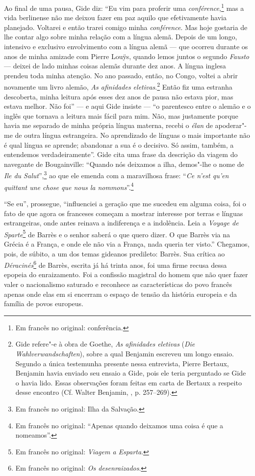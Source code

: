 Ao final de uma pausa, Gide diz: ``Eu vim para proferir uma
\emph{conférence},\footnote{Em francês no original: conferência. \versal{[N.~T.]}} mas a vida
berlinense não me deixou fazer em paz aquilo que efetivamente havia
planejado. Voltarei e então trarei comigo minha \emph{conférence}. Mas
hoje gostaria de lhe contar algo sobre minha relação com a língua alemã.
Depois de um longo, intensivo e exclusivo envolvimento com a língua
alemã --- que ocorreu durante os anos de minha amizade com Pierre Louÿs,
quando lemos juntos o segundo \emph{Fausto} --- deixei de lado minhas
coisas alemãs durante dez anos. A língua inglesa prendeu toda minha
atenção. No ano passado, então, no Congo, voltei a abrir novamente um
livro alemão, \emph{As afinidades eletivas}.\footnote{Gide
  refere"-e à obra de Goethe, \emph{As afinidades eletivas} (\emph{Die
  Wahlverwandschaften}), sobre a qual Benjamin escreveu um longo ensaio.
  Segundo a única testemunha presente nessa entrevista, Pierre Bertaux,
  Benjamin havia enviado seu ensaio a Gide, pois ele teria perguntado se
  Gide o havia lido. Essas observações foram feitas em carta de Bertaux
  a respeito desse encontro (Cf. Walter Benjamin, ,
  p. 257--269). \versal{[N.~T.]}} Então fiz uma estranha descoberta, minha leitura após esses
dez anos de pausa não estava pior, mas estava melhor. Não foi'' --- e aqui
Gide insiste --- ``o parentesco entre o alemão e o inglês que tornava a
leitura mais fácil para mim. Não, mas justamente porque havia me
separado de minha própria língua materna, recebi o \emph{élan} de
apoderar"-me de outra língua estrangeira. No aprendizado de línguas o
mais importante não é qual língua se aprende; abandonar a sua é o
decisivo. Só assim, também, a entendemos verdadeiramente''. Gide cita
uma frase da descrição da viagem do navegante de Bougainville: ``Quando
nós deixamos a ilha, demos"-lhe o nome de \emph{Ile du Salut}'',\footnote{Em francês no original: Ilha da Salvação. \versal{[N.~T.]}} ao que ele emenda com a maravilhosa
frase: ``\emph{Ce n'est qu'en quittant une chose que nous la
nommons}''.\footnote{Em francês no original: ``Apenas quando deixamos uma coisa é que a
  nomeamos''. \versal{[N.~T.]}}

``Se eu'', prossegue, ``influenciei a geração que me sucedeu em alguma
coisa, foi o fato de que agora os franceses começam a mostrar interesse
por terras e línguas estrangeiras, onde antes reinava a indiferença e a
indolência. Leia a \emph{Voyage de Sparte}\footnote{Em francês no original: \emph{Viagem
  a Esparta}. \versal{[N.~T.]}} de Barrès e o senhor saberá o que quero dizer. O que
Barrès via na Grécia é a França, e onde ele não via a França, nada
queria ter visto.'' Chegamos, pois, de súbito, a um dos temas gideanos
predileto: Barrès. Sua crítica ao \emph{Déracinés}\footnote{Em francês no original: \emph{Os desenraizados}. \versal{[N.~T.]}} de Barrès, escrita já há trinta anos, foi uma firme recusa dessa
epopeia do enraizamento. Foi a confissão magistral do homem que não quer
fazer valer o nacionalismo saturado e reconhece as características do
povo francês apenas onde elas em si encerram o espaço de tensão da
história europeia e da família de povos europeus.

